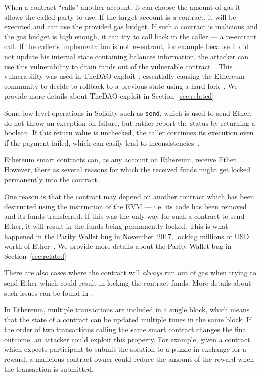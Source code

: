 \point{\reentrancy~(\vre)}
When a contract ``calls'' another account, it can choose the amount of gas it allows the called party to use. If the target account is a contract, it will be executed and can use the provided gas budget. If such a contract is malicious and the gas budget is high enough, it can try to call back in the caller --- a re-entrant call. If the caller's implementation is not re-entrant, for example because it did not update his internal state containing balances information, the attacker can use this vulnerability to drain funds out of the vulnerable contract~\cite{Luu2016a,DBLP:conf/ndss/KalraGDS18,Tsankov2018}.
This vulnerability was used in TheDAO exploit~\cite{Securities2017}, essentially causing the Ethereum community to decide to rollback to a previous state using a hard-fork~\cite{mehar2019understanding}. We provide more details about TheDAO exploit in Section~\ref{sec:related}

\point{\unhandledexceptions~(\vue)}
Some low-level operations in Solidity such as \lstinline{send}, which is used to send Ether, do not throw an exception on failure, but rather report the status by returning a boolean. If this return value is unchecked, the caller continues its execution even if the payment failed, which can easily lead to inconsistencies~\cite{Brent2018,Luu2016a,Tikhomirov2017,DBLP:conf/ndss/KalraGDS18}.

\point{\lockedether~(\vle)}
Ethereum smart contracts can, as any account on Ethereum, receive Ether. However, there as several reasons for which the received funds might get locked permanently into the contract.

One reason is that the contract may depend on another contract which has been
destructed using the  instruction of the EVM --- i.e. its code has been removed and its funds transferred. If this was the only way for such a contract to send Ether, it will result in the funds being permanently locked. This is what happened in the Parity Wallet bug in November~2017, locking millions of USD worth of Ether~\cite{Breidenbach}. We provide more details about the Parity Wallet bug in Section~\ref{sec:related}

There are also cases where the contract will \emph{always} run out of gas when trying
to send Ether which could result in locking the contract funds. More details about such issues can be found in~\cite{Grech2018}.

\point{\transactionorder~(\vto)}
In Ethereum, multiple transactions are included in a single block, which means that the state of a contract can be updated multiple times in the same block. If the order of two transactions calling the same smart contract changes the final outcome, an attacker could exploit this property. For example, given a contract which expects participant to submit the solution to a puzzle in exchange for a reward, a malicious contract owner could reduce the amount of the reward when the transaction is submitted.

